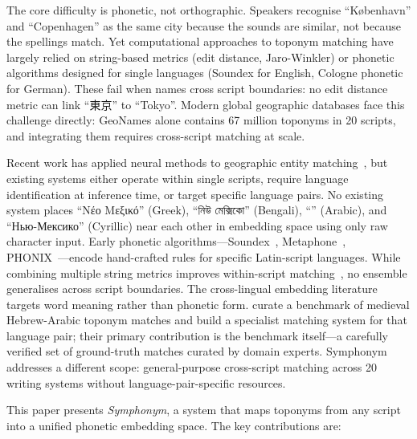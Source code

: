 \documentclass[11pt,a4paper]{article}
\newcommand{\textar}[1]{{\arabicfont\RL{#1}}}
\newcommand{\textbn}[1]{{\bengalifont #1}}
\newcommand{\textcn}[1]{{\chinesefont #1}}
\begin{document}
The core difficulty is phonetic, not orthographic. Speakers recognise ``København'' and ``Copenhagen'' as the same city because the sounds are similar, not because the spellings match. Yet computational approaches to toponym matching have largely relied on string-based metrics (edit distance, Jaro-Winkler) or phonetic algorithms designed for single languages (Soundex for English, Cologne phonetic for German). These fail when names cross script boundaries: no edit distance metric can link ``\textcn{東京}'' to ``Tokyo''. Modern global geographic databases face this challenge directly: GeoNames alone contains 67 million toponyms in 20 scripts, and integrating them requires cross-script matching at scale.

Recent work has applied neural methods to geographic entity matching~\citep{qiu2024geobert,rama2016,mehdie2025}, but existing systems either operate within single scripts, require language identification at inference time, or target specific language pairs. No existing system places ``Νέο Μεξικό'' (Greek), ``\textbn{নিউ মেক্সিকো}'' (Bengali), ``\textar{نيومكسيكو}'' (Arabic), and ``Нью-Мексико'' (Cyrillic) near each other in embedding space using only raw character input. Early phonetic algorithms---Soundex~\citep{odell1918}, Metaphone~\citep{philips1990}, PHONIX~\citep{gadd1990phonix}---encode hand-crafted rules for specific Latin-script languages. While combining multiple string metrics improves within-script matching~\citep{recchia2013,santos2018}, no ensemble generalises across script boundaries. The cross-lingual embedding literature~\citep{conneau2018,artetxe2018} targets word meaning rather than phonetic form. \citet{mehdie2025} curate a benchmark of medieval Hebrew-Arabic toponym matches and build a specialist matching system for that language pair; their primary contribution is the benchmark itself---a carefully verified set of ground-truth matches curated by domain experts. Symphonym addresses a different scope: general-purpose cross-script matching across 20 writing systems without language-pair-specific resources.

This paper presents \emph{Symphonym}, a system that maps toponyms from any script into a unified phonetic embedding space. The key contributions are:
\end{document}
